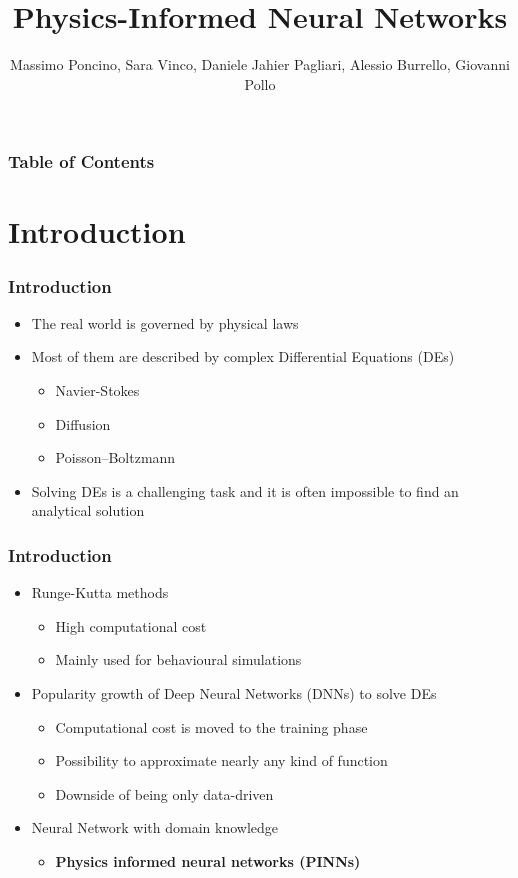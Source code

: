 \documentclass{beamer}
\title{Physics-Informed Neural Networks}
\author[Giovanni Pollo]{Massimo Poncino\inst{1}, Sara Vinco\inst{1}, Daniele Jahier Pagliari\inst{1}, Alessio Burrello\inst{1,}\inst{2}, Giovanni Pollo\inst{1}}
\institute[Politecnico di Torino] %
{
  \inst{1}%
  Politecnico di Torino
  \and
  \inst{2}%
  Alma Mater Studiorum - Università di Bologna
}
\begin{document}
\frame{\titlepage}
\begin{frame}
  \frametitle{Table of Contents}
  \tableofcontents
\end{frame}

\section{Introduction}
\begin{frame}
  \frametitle{Introduction}
  \begin{itemize}
    \item The real world is governed by physical laws
    \item Most of them are described by complex Differential Equations (DEs)
          \begin{itemize}
            \item Navier-Stokes
            \item Diffusion
            \item Poisson–Boltzmann
          \end{itemize}
    \item Solving DEs is a challenging task and it is often impossible to find an analytical solution
  \end{itemize}
\end{frame}

\begin{frame}
  \frametitle{Introduction}
  \begin{itemize}
    \item Runge-Kutta methods
          \begin{itemize}
            \item High computational cost
            \item Mainly used for behavioural simulations
          \end{itemize}
    \item Popularity growth of Deep Neural Networks (DNNs) to solve DEs \cite{deep-neural-network-for-system-of-ordinary-differential-equations-vectorized-algorithm-and-simulation}
          \begin{itemize}
            \item Computational cost is moved to the training phase
            \item Possibility to approximate nearly any kind of function
            \item Downside of being only data-driven
          \end{itemize}
    \item Neural Network with domain knowledge
          \begin{itemize}
            \item \textbf{Physics informed neural networks (PINNs)}
          \end{itemize}
  \end{itemize}
\end{frame}
\end{document}
